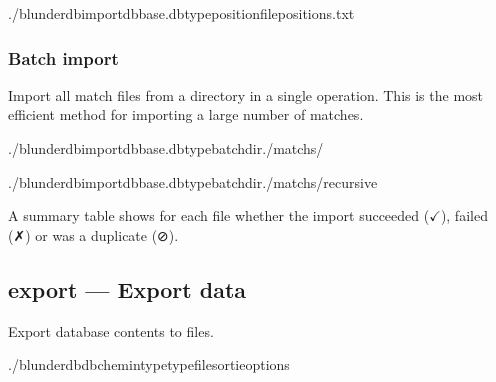 \documentclass[letterpaper,10pt,english]{sphinxmanual}
\begin{document}
\begin{sphinxVerbatim}[commandchars=\\\{\}]
./blunderdbimport\PYGZhy{}\PYGZhy{}dbbase.db\PYGZhy{}\PYGZhy{}typeposition\PYGZhy{}\PYGZhy{}filepositions.txt
\end{sphinxVerbatim}


\subsubsection{Batch import}
\label{\detokenize{cli:import-par-lot}}
\sphinxAtStartPar
Import all match files from a directory in a single operation. This is the most efficient method for importing a large number of matches.

\begin{sphinxVerbatim}[commandchars=\\\{\}]
./blunderdbimport\PYGZhy{}\PYGZhy{}dbbase.db\PYGZhy{}\PYGZhy{}typebatch\PYGZhy{}\PYGZhy{}dir./matchs/

./blunderdbimport\PYGZhy{}\PYGZhy{}dbbase.db\PYGZhy{}\PYGZhy{}typebatch\PYGZhy{}\PYGZhy{}dir./matchs/\PYGZhy{}\PYGZhy{}recursive
\end{sphinxVerbatim}

\sphinxAtStartPar
A summary table shows for each file whether the import succeeded (\(\checkmark\)), failed (✗) or was a duplicate (⊘).


\subsection{export — Export data}
\label{\detokenize{cli:export-exporter-des-donnees}}
\sphinxAtStartPar
Export database contents to files.

\begin{sphinxVerbatim}[commandchars=\\\{\}]
./blunderdb\PYGZhy{}\PYGZhy{}db\PYGZlt{}chemin\PYGZgt{}\PYGZhy{}\PYGZhy{}type\PYGZlt{}type\PYGZgt{}\PYGZhy{}\PYGZhy{}file\PYGZlt{}sortie\PYGZgt{}\PYG{o}{[}options\PYG{o}{]}
\end{sphinxVerbatim}
\end{document}
